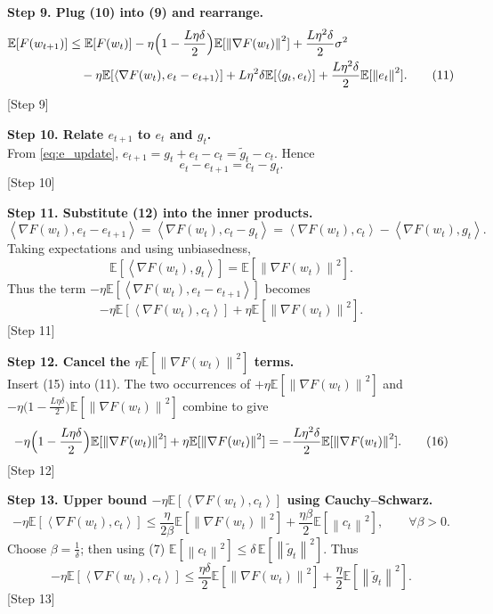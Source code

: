 \documentclass{article}
\newcommand{\E}{\mathbb{E}}
\newcommand{\norm}[1]{\left\lVert #1 \right\rVert}
\newcommand{\inner}[2]{\left\langle #1,#2 \right\rangle}
\begin{document}
\bigskip
\noindent\textbf{Step 9. Plug (10) into (9) and rearrange.}\\
\begin{align}
\E[F(w_{t+1})]
&\le \E[F(w_t)]
   -\eta\Bigl(1-\frac{L\eta\delta}{2}\Bigr)\E[\norm{\nabla F(w_t)}^{2}]
   +\frac{L\eta^{2}\delta}{2}\sigma^{2} \nonumber\\
&\quad -\eta\E[\inner{\nabla F(w_t)}{e_t-e_{t+1}}]
   +L\eta^{2}\delta \E[\inner{g_t}{e_t}]
   +\frac{L\eta^{2}\delta}{2}\E[\norm{e_t}^{2}]. \tag{11}
\end{align}
[Step 9]

\bigskip
\noindent\textbf{Step 10. Relate $e_{t+1}$ to $e_t$ and $g_t$.}\\
From \eqref{eq:e_update}, $e_{t+1}=g_t+e_t-c_t =\tilde g_t-c_t$.  Hence
\[
e_t-e_{t+1}=c_t-g_t. \tag{12}
\]
[Step 10]

\bigskip
\noindent\textbf{Step 11. Substitute (12) into the inner products.}\\
\[
\inner{\nabla F(w_t)}{e_t-e_{t+1}}
   =\inner{\nabla F(w_t)}{c_t-g_t}
   =\inner{\nabla F(w_t)}{c_t}-\inner{\nabla F(w_t)}{g_t}. \tag{13}
\]
Taking expectations and using unbiasedness,
\[
\E[\inner{\nabla F(w_t)}{g_t}] = \E[\norm{\nabla F(w_t)}^{2}]. \tag{14}
\]
Thus the term $-\eta\E[\inner{\nabla F(w_t)}{e_t-e_{t+1}}]$ becomes
\[
-\eta\E[\inner{\nabla F(w_t)}{c_t}]
   +\eta\E[\norm{\nabla F(w_t)}^{2}]. \tag{15}
\]
[Step 11]

\bigskip
\noindent\textbf{Step 12. Cancel the $\eta\E[\norm{\nabla F(w_t)}^{2}]$ terms.}\\
Insert (15) into (11). The two occurrences of $+\eta\E[\norm{\nabla F(w_t)}^{2}]$ and $-\eta\big(1-\frac{L\eta\delta}{2}\big)\E[\norm{\nabla F(w_t)}^{2}]$ combine to give
\[
-\eta\Bigl(1-\frac{L\eta\delta}{2}\Bigr)\E[\norm{\nabla F(w_t)}^{2}]
   +\eta\E[\norm{\nabla F(w_t)}^{2}]
= -\frac{L\eta^{2}\delta}{2}\E[\norm{\nabla F(w_t)}^{2}]. \tag{16}
\]
[Step 12]

\bigskip
\noindent\textbf{Step 13. Upper bound $-\eta\E[\inner{\nabla F(w_t)}{c_t}]$ using Cauchy–Schwarz.}\\
\[
-\eta\E[\inner{\nabla F(w_t)}{c_t}]
\le \frac{\eta}{2\beta}\E[\norm{\nabla F(w_t)}^{2}]
     +\frac{\eta\beta}{2}\E[\norm{c_t}^{2}],\qquad\forall\beta>0. \tag{17}
\]
Choose $\beta=\frac{1}{\delta}$; then using (7) $\E[\norm{c_t}^{2}]\le\delta\,\E[\norm{\tilde g_t}^{2}]$.
Thus
\[
-\eta\E[\inner{\nabla F(w_t)}{c_t}]
\le \frac{\eta\delta}{2}\E[\norm{\nabla F(w_t)}^{2}]
   +\frac{\eta}{2}\E[\norm{\tilde g_t}^{2}]. \tag{18}
\]
[Step 13]
\end{document}
